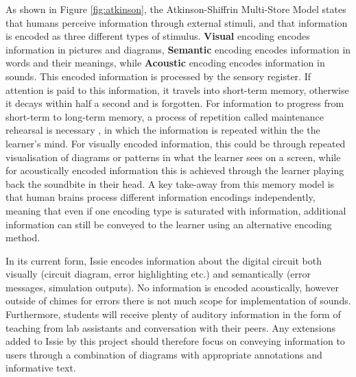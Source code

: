 As shown in Figure \ref{fig:atkinson}, the Atkinson-Shiffrin Multi-Store Model states that humans perceive information through external stimuli, and that information is encoded as three different types of stimulus. \textbf{Visual} encoding encodes information in pictures and diagrams, \textbf{Semantic} encoding encodes information in words and their meanings, while \textbf{Acoustic} encoding encodes information in sounds. This encoded information is processed by the sensory register. If attention is paid to this information, it travels into short-term memory, otherwise it decays within half a second and is forgotten. For information to progress from short-term to long-term memory, a process of repetition called maintenance rehearsal is necessary \cite{multi_store}, in which the information is repeated within the the learner's mind. For visually encoded information, this could be through repeated visualisation of diagrams or patterns in what the learner sees on a screen, while for acoustically encoded information this is achieved through the learner playing back the soundbite in their head. A key take-away from this memory model is that human brains process different information encodings independently, meaning that even if one encoding type is saturated with information, additional information can still be conveyed to the learner using an alternative encoding method. 

In its current form, Issie encodes information about the digital circuit both visually (circuit diagram, error highlighting etc.) and semantically (error messages, simulation outputs). No information is encoded acoustically, however outside of chimes for errors there is not much scope for implementation of sounds. Furthermore, students will receive plenty of auditory information in the form of teaching from lab assistants and conversation with their peers. Any extensions added to Issie by this project should therefore focus on conveying information to users through a combination of diagrams with appropriate annotations and informative text.

